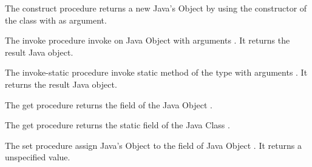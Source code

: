 \begin{entry}{%
}

The {\cf construct} procedure returns a new Java's Object by using the constructor of the class  with  as argument.

\end{entry}



\begin{entry}{%
}

The {\cf invoke} procedure invoke  on Java Object  with arguments . It returns the result Java object.

\end{entry}



\begin{entry}{%
}

The {\cf invoke-static} procedure invoke static method  of the type  with arguments . It returns the result Java object.

\end{entry}



\begin{entry}{%
}

The {\cf get} procedure returns the field  of the Java Object .

\end{entry}



\begin{entry}{%
}

The {\cf get} procedure returns the static field  of the Java Class .
\end{entry}



\begin{entry}{%
}

The {\cf set} procedure assign Java's Object  to the field  of Java Object . It returns a unspecified value.

\end{entry}



